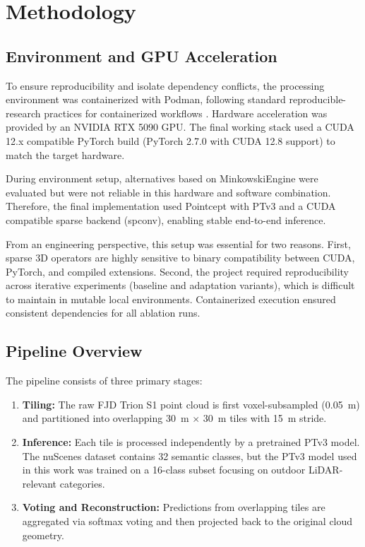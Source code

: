 \documentclass[12pt, a4paper]{report}
\begin{document}
\chapter{Methodology}
\section{Environment and GPU Acceleration}
To ensure reproducibility and isolate dependency conflicts, the processing environment was containerized with Podman, following standard reproducible-research practices for containerized workflows \cite{boettiger2015introduction}. Hardware acceleration was provided by an NVIDIA RTX 5090 \ac{GPU}. The final working stack used a CUDA 12.x compatible PyTorch build (PyTorch 2.7.0 with CUDA 12.8 support) to match the target hardware.

During environment setup, alternatives based on MinkowskiEngine were evaluated but were not reliable in this hardware and software combination. Therefore, the final implementation used Pointcept with \ac{PTv3} and a CUDA compatible sparse backend (spconv), enabling stable end-to-end inference.

From an engineering perspective, this setup was essential for two reasons. First, sparse 3D operators are highly sensitive to binary compatibility between CUDA, PyTorch, and compiled extensions. Second, the project required reproducibility across iterative experiments (baseline and adaptation variants), which is difficult to maintain in mutable local environments. Containerized execution ensured consistent dependencies for all ablation runs.


\section{Pipeline Overview}
The pipeline consists of three primary stages:
\begin{enumerate}
    \item \textbf{Tiling:} The raw FJD Trion S1 point cloud is first voxel-subsampled (\SI{0.05}{m}) and partitioned into overlapping \SI{30}{m} $\times$ \SI{30}{m} tiles with \SI{15}{m} stride.
    \item \textbf{Inference:} Each tile is processed independently by a pretrained \ac{PTv3} model. The nuScenes dataset \cite{caesar2020nuscenes,nuscenes_website} contains 32 semantic classes, but the \ac{PTv3} model used in this work was trained on a 16-class subset focusing on outdoor LiDAR-relevant categories.
    \item \textbf{Voting and Reconstruction:} Predictions from overlapping tiles are aggregated via softmax voting and then projected back to the original cloud geometry.
\end{enumerate}
\end{document}
